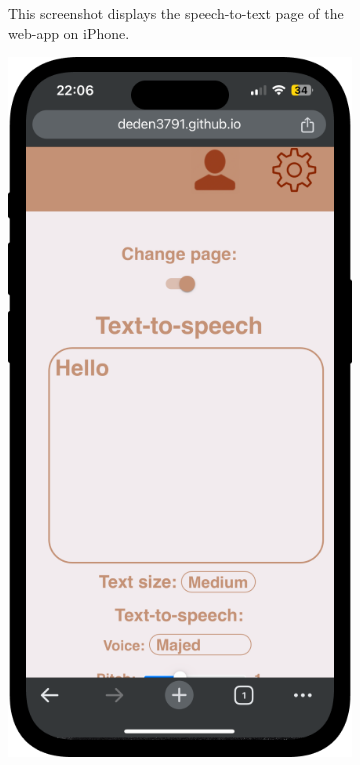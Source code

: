 \documentclass{l4proj}
\begin{document}
\begin{figure}
\begin{subfigure}[b]{0.30\textwidth}
        \caption{This screenshot displays the speech-to-text page of the web-app on iPhone.}
        \label{fig:captions-phone}
    \end{subfigure}
    \begin{subfigure}[b]{0.30\textwidth}
        \includegraphics[width=\textwidth]{dissertation/images/text-page-phone.png}

\end{subfigure}
\end{figure}
\end{document}
